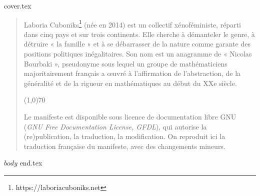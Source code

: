 \documentclass[12pt]{book}
\begin{document}


{cover.tex}
\clearpage
\begin{quote}
\singlespacing
{\footnotesize Laboria Cuboniks\footnote{\selectfont https://laboriacuboniks.net} (née en 2014) est un collectif xénoféministe, réparti dans cinq pays et sur trois continents. Elle cherche à démanteler le genre, à détruire « la famille » et à se débarrasser de la nature comme garante des positions politiques inégalitaires. Son nom est un anagramme de « Nicolas Bourbaki », pseudonyme sous lequel un groupe de mathématiciens majoritairement français a œuvré à l'affirmation de l'abstraction, de la généralité et de la rigueur en mathématiques au début du XXe siècle.}
\begin{center}
\line(1,0){70}
\end{center}
{\footnotesize Le manifeste est disponible sous licence de documentation libre GNU (\textit{GNU Free Documentation License, GFDL}), qui autorise la (re)publication, la traduction, la modification. On reproduit ici la traduction française du manifeste, avec des changements mineurs. }
\clearpage
\end{quote}

\onehalfspacing %

$body$
{end.tex}

\end{document}
